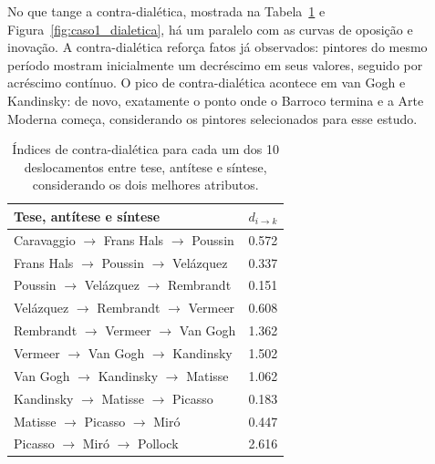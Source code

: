 No que tange a contra-dialética, mostrada na
Tabela~\ref{tab:dialetica1} e Figura~\ref{fig:caso1_dialetica}, há um
paralelo com as curvas de oposição e inovação. A contra-dialética
reforça fatos já observados: pintores do mesmo período mostram
inicialmente um decréscimo em seus valores, seguido por acréscimo
contínuo. O pico de contra-dialética acontece em van Gogh e Kandinsky:
de novo, exatamente o ponto onde o Barroco termina e a Arte Moderna
começa, considerando os pintores selecionados para esse estudo.

\begin{table}[ht]
  \begin{center}
  \caption{\label{tab:dialetica1} Índices de contra-dialética para cada um dos
    10 deslocamentos entre tese, antítese e síntese, considerando os dois
    melhores atributos.}
\begin{tabular}{@{}ll}
  
    \hline \hline
    Tese, antítese e síntese & $d_{i \rightarrow k}$ \\
    \hline
    Caravaggio $\to$ Frans Hals $\to$ Poussin   & 0.572 \\
    Frans Hals $\to$ Poussin $\to$ Vel\'{a}zquez & 0.337 \\
    Poussin $\to$ Vel\'{a}zquez $\to$ Rembrandt  & 0.151 \\
    Vel\'{a}zquez $\to$ Rembrandt $\to$ Vermeer  & 0.608 \\
    Rembrandt $\to$ Vermeer $\to$ Van Gogh      & 1.362 \\
    Vermeer $\to$ Van Gogh $\to$ Kandinsky      & 1.502 \\
    Van Gogh $\to$ Kandinsky $\to$ Matisse      & 1.062 \\
    Kandinsky $\to$ Matisse $\to$ Picasso       & 0.183 \\
    Matisse $\to$ Picasso $\to$ Mir\'{o}         & 0.447 \\
    Picasso $\to$ Mir\'{o} $\to$ Pollock         & 2.616 \\
    \hline \hline
  \end{tabular}
\end{center}
\end{table}


